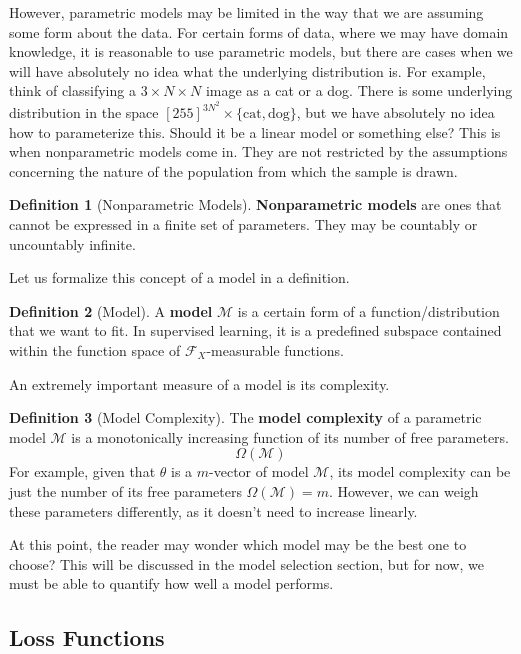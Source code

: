 \documentclass{article}
\theoremstyle{definition}
\theoremstyle{remark}
\theoremstyle{definition}
\newtheorem{definition}{Definition}[section]
\begin{document}
However, parametric models may be limited in the way that we are assuming some form about the data. For certain forms of data, where we may have domain knowledge, it is reasonable to use parametric models, but there are cases when we will have absolutely no idea what the underlying distribution is. For example, think of classifying a $3 \times N \times N$ image as a cat or a dog. There is some underlying distribution in the space $[255]^{3 N^2} \times \{\text{cat}, \text{dog}\}$, but we have absolutely no idea how to parameterize this. Should it be a linear model or something else? This is when nonparametric models come in. They are not restricted by the assumptions concerning the nature of the population from which the sample is drawn. 

\begin{definition}[Nonparametric Models]
\textbf{Nonparametric models} are ones that cannot be expressed in a finite set of parameters. They may be countably or uncountably infinite. 
\end{definition}

Let us formalize this concept of a model in a definition. 

\begin{definition}[Model]
A \textbf{model} $\mathcal{M}$ is a certain form of a function/distribution that we want to fit. In supervised learning, it is a predefined subspace contained within the function space of $\mathcal{F}_X$-measurable functions. 
\end{definition}

An extremely important measure of a model is its complexity. 

\begin{definition}[Model Complexity]
The \textbf{model complexity} of a parametric model $\mathcal{M}$ is a monotonically increasing function of its number of free parameters. 
\[\Omega(\mathcal{M})\]
For example, given that $\theta$ is a $m$-vector of model $\mathcal{M}$, its model complexity can be just the number of its free parameters $\Omega(\mathcal{M}) = m$. However, we can weigh these parameters differently, as it doesn't need to increase linearly. 
\end{definition}

At this point, the reader may wonder which model may be the best one to choose? This will be discussed in the model selection section, but for now, we must be able to quantify how well a model performs. 

\subsection{Loss Functions}
\end{document}
